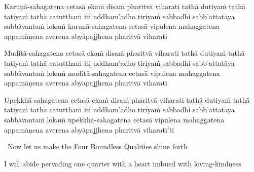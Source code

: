 \medskip

\begin{pali-hang}
  Karuṇā-sahagatena cetasā ekaṁ disaṁ pharitvā viharati tathā dutiyaṁ tathā tatiyaṁ tathā catutthaṁ iti uddham'adho tiriyaṁ sabbadhi sabb'attatāya sabbāvantaṁ lokaṁ karuṇā-sahagatena cetasā vipulena mahaggatena appamāṇena averena abyāpajjhena pharitvā viharati
\end{pali-hang}

\medskip

\begin{pali-hang}
  Muditā-sahagatena cetasā ekaṁ disaṁ pharitvā viharati tathā dutiyaṁ tathā tatiyaṁ tathā catutthaṁ iti uddham'adho tiriyaṁ sabbadhi sabb'attatāya sabbāvantaṁ lokaṁ muditā-sahagatena cetasā vipulena mahaggatena appamāṇena averena abyāpajjhena pharitvā viharati
\end{pali-hang}

\medskip

\begin{pali-hang}
  Upekkhā-sahagatena cetasā ekaṁ disaṁ pharitvā viharati tathā dutiyaṁ tathā tatiyaṁ tathā catutthaṁ iti uddham'adho tiriyaṁ sabbadhi sabb'attatāya sabbāvantaṁ lokaṁ upekkhā-sahagatena cetasā vipulena mahaggatena appamāṇena averena abyāpajjhena pharitvā viharatī'ti
\end{pali-hang}

\clearpage

\begin{leader-english}
  \anglebracketleft\ \hspace{-0.5mm}Now let us make the Four Boundless Qualities shine forth \hspace{-0.5mm}\anglebracketright\
\end{leader-english}

\smallskip

\begin{english-hang}
  I will abide pervading one quarter with a heart imbued with loving-kindness
\end{english-hang}

